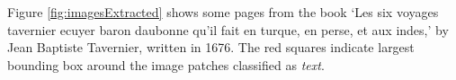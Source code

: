 

Figure \ref{fig:imagesExtracted} shows some pages from the book `Les six voyages
tavernier ecuyer baron daubonne qu'il fait en turque, en perse, et aux indes,'
by Jean Baptiste Tavernier, written in 1676. The red squares indicate largest
bounding box around the image patches classified as \emph{text}.

